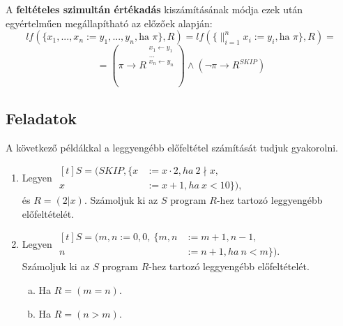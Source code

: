 \documentclass[12pt]{article}
\begin{document}
A \textbf{feltételes szimultán értékadás} kiszámításának módja ezek után egyértelműen megállapítható az előzőek alapján:
$$lf(\{x_1, ..., x_n := y_1, ..., y_n, \text{ha } \pi \}, R) = lf(\{ \mathop{\parallel}_{i=1}^{n} x_i := y_i, \text{ha }\pi \}, R) = $$
$$= (\pi \rightarrow R^{\substack{ x_1 \leftarrow y_1 \\ ... \\ x_n \leftarrow y_n }}) \land (\neg \pi \rightarrow R^{SKIP})$$

\subsection{Feladatok}\label{lf-feladat}
A következő példákkal a leggyengébb előfeltétel számítását tudjuk gyakorolni.

\begin{enumerate}
	\item Legyen $\begin{aligned}[t]
			S = (SKIP, \{x &:= x \cdot 2, ha\ 2 \nmid x,\\
				x &:= x + 1, ha\ x < 10\}),
		\end{aligned}$\\
		és $R = (2 | x)$. Számoljuk ki az $S$ program $R$-hez tartozó leggyengébb előfeltételét.
	\item Legyen $\begin{aligned}[t]
			S = (m,n := 0,0,\ \{m,n &:= m+1, n-1,\\
				n &:= n + 1, ha\ n < m\}).
		\end{aligned}$\\
		Számoljuk ki az $S$ program $R$-hez tartozó leggyengébb előfeltételét.
		\begin{enumerate}[a)]
			\item Ha $R = (m = n).$
			\item Ha $R = (n > m).$
		\end{enumerate}
\end{enumerate}


\newpage
\end{document}
